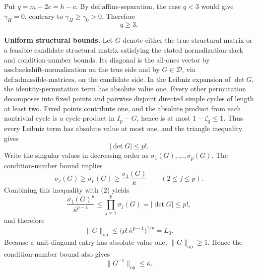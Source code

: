 Put \(q=m-2c=h-c\). By \(\text{def:affine-separation}\), the case \(q<3\) would give \(\gamma_H=0\), contrary to \(\gamma_H\geq\gamma_0>0\). Therefore
\[
q\geq3.
\tag{1}
\]

\textbf{Uniform structural bounds.}
Let \(G\) denote either the true structural matrix or a feasible candidate structural matrix satisfying the stated normalization-slack and condition-number bounds. Its diagonal is the all-ones vector by \(\text{ass:backshift-normalization}\) on the true side and by \(G\in\mathcal D\), via \(\text{def:admissible-matrices}\), on the candidate side. In the Leibniz expansion of \(\det G\), the identity-permutation term has absolute value one. Every other permutation decomposes into fixed points and pairwise disjoint directed simple cycles of length at least two. Fixed points contribute one, and the absolute product from each nontrivial cycle is a cycle product in \(I_p-G\), hence is at most \(1-\zeta_0\leq1\). Thus every Leibniz term has absolute value at most one, and the triangle inequality gives
\[
|\det G|\leq p!.
\tag{2}
\]
Write the singular values in decreasing order as \(\sigma_1(G),\ldots,\sigma_p(G)\). The condition-number bound implies
\[
\sigma_j(G)\geq\sigma_p(G)
\geq\frac{\sigma_1(G)}{\overline\kappa}
\qquad(2\leq j\leq p).
\]
Combining this inequality with (2) yields
\[
\frac{\sigma_1(G)^p}{\overline\kappa^{p-1}}
\leq\prod_{j=1}^p\sigma_j(G)
=|\det G|
\leq p!,
\]
and therefore
\[
\|G\|_{\mathrm{op}}
\leq\bigl(p!\,\overline\kappa^{p-1}\bigr)^{1/p}
=L_0.
\tag{3}
\]
Because a unit diagonal entry has absolute value one, \(\|G\|_{\mathrm{op}}\geq1\). Hence the condition-number bound also gives
\[
\|G^{-1}\|_{\mathrm{op}}
\leq\overline\kappa.
\tag{4}
\]

